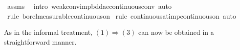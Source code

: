 \documentclass[leqno]{article}
\theoremstyle{definition}
\begin{document}
\begin{isabellebody}
\isamarkupfalse%
\ assms\ \isamarkupfalse%
\ {\isacharparenleft}intro\ weak{\isacharunderscore}conv{\isacharunderscore}imp{\isacharunderscore}bdd{\isacharunderscore}ae{\isacharunderscore}continuous{\isacharunderscore}conv{\isacharcomma}\ auto{\isacharparenright}\isanewline
\ \ \isamarkupfalse%
\ {\isacharparenleft}rule\ borel{\isacharunderscore}measurable{\isacharunderscore}continuous{\isacharunderscore}on{}{\isacharparenright}\isanewline
{}\isamarkupfalse%
\ {\isacharparenleft}rule\ continuous{\isacharunderscore}at{\isacharunderscore}imp{\isacharunderscore}continuous{\isacharunderscore}on{\isacharcomma}\ auto{\isacharparenright}%
\end{isabellebody}

\medskip

As in the informal treatment, $(1) \Longrightarrow (3)$ can now be obtained in a straightforward manner.

\medskip
\end{document}
